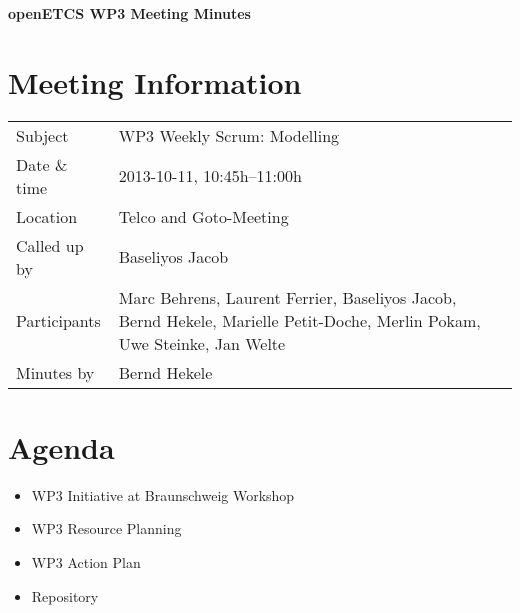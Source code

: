 \documentclass[a4paper, 11pt]{article}
\begin{document}
{\begin{center}\huge\bf openETCS WP3 Meeting Minutes\end{center}}
\section{Meeting Information}

\renewcommand{\arraystretch}{1.5}
\begin{supertabular}{m{.2\textwidth}m{.8\textwidth}}
Subject & WP3 Weekly Scrum: Modelling\\
Date \& time & 2013-10-11, 10:45h--11:00h\\
Location & Telco and Goto-Meeting\\
Called up by & Baseliyos Jacob\\
Participants &
Marc Behrens,
Laurent Ferrier,
Baseliyos Jacob,
Bernd Hekele,
Marielle Petit-Doche,
Merlin Pokam,
Uwe Steinke,
Jan Welte
\\

Minutes by & Bernd Hekele\\
\end{supertabular}
\renewcommand{\arraystretch}{1.0}


\section{{Agenda}}
\begin{itemize}
\item WP3 Initiative at Braunschweig Workshop
\item WP3 Resource Planning
\item WP3 Action Plan
\item Repository
\end{itemize}
\end{document}
